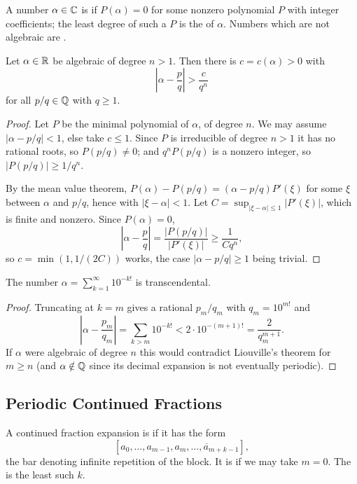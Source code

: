 \documentclass[a4paper]{scrartcl}
\begin{document}
\begin{definition}
	A number $\alpha \in \mathbb{C}$ is  if $P(\alpha) = 0$ for some nonzero polynomial $P$ with integer coefficients; the least degree of such a $P$ is the  of $\alpha$. Numbers which are not algebraic are .
\end{definition}

\begin{theorem}[Liouville]
	Let $\alpha \in \mathbb{R}$ be algebraic of degree $n > 1$. Then there is $c = c(\alpha) > 0$ with
	$$
	\left|\alpha - \frac pq\right| > \frac c{q^n}
	$$
	for all $p/q \in \mathbb{Q}$ with $q \geq 1$.
\end{theorem}
\begin{proof}
	Let $P$ be the minimal polynomial of $\alpha$, of degree $n$. We may assume $|\alpha - p/q| < 1$, else take $c \leq 1$. Since $P$ is irreducible of degree $n > 1$ it has no rational roots, so $P(p/q) \neq 0$; and $q^nP(p/q)$ is a nonzero integer, so $|P(p/q)| \geq 1/q^n$.

	By the mean value theorem, $P(\alpha) - P(p/q) = (\alpha - p/q)P'(\xi)$ for some $\xi$ between $\alpha$ and $p/q$, hence with $|\xi - \alpha| < 1$. Let $C = \sup_{|\xi - \alpha| \leq 1}|P'(\xi)| $, which is finite and nonzero. Since $P(\alpha) = 0$,
	$$
	\left|\alpha - \frac pq\right| = \frac{|P(p/q)|}{|P'(\xi)|} \geq \frac{1}{Cq^n},
	$$
	so $c = \min(1, 1/(2C))$ works, the case $|\alpha - p/q| \geq 1$ being trivial.
\end{proof}

\begin{corollary}
	The number $\alpha = \sum_{k=1}^\infty 10^{-k!}$ is transcendental.
\end{corollary}
\begin{proof}
	Truncating at $k = m$ gives a rational $p_m/q_m$ with $q_m = 10^{m!}$ and
	$$
	\left|\alpha - \frac{p_m}{q_m}\right| = \sum_{k > m}10^{-k!} < 2\cdot 10^{-(m+1)!} = \frac{2}{q_m^{m+1}}.
	$$
	If $\alpha$ were algebraic of degree $n$ this would contradict Liouville's theorem for $m \geq n$ (and $\alpha \notin \mathbb{Q}$ since its decimal expansion is not eventually periodic).
\end{proof}

\subsection{Periodic Continued Fractions}

\begin{definition}
	A continued fraction expansion is  if it has the form
	$$
	[a_0, \dots, a_{m-1}, \overline{a_m, \dots, a_{m+k-1}}],
	$$
	the bar denoting infinite repetition of the block. It is  if we may take $m = 0$. The  is the least such $k$.
\end{definition}
\end{document}
